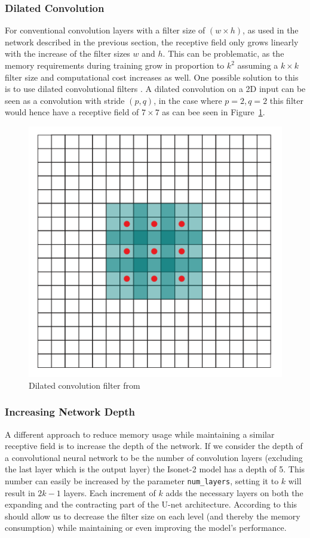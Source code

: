 \documentclass[a4paper, 12pt]{article} %
\begin{document}
\subsubsection{Dilated Convolution}
For conventional convolution layers with a filter size of $(w \times h)$, as used in the network described in the previous section, the receptive field only grows linearly with the increase of the filter sizes $w$ and $h$. This can be problematic, as the memory requirements during training grow in proportion to $k^2$ assuming a $k \times k$ filter size and computational cost increases as well. One possible solution to this is to use dilated convolutional filters \citep{ferenc-dilated}. A dilated convolution on a 2D input can be seen as a convolution with stride $(p, q)$, in the case where $p=2, q=2$ this filter would hence have a receptive field of $7 \times 7$ as can bee seen in Figure~\ref{fig:dilated}.
\begin{figure}[h]
    \center%
    \includegraphics[width=0.3\columnwidth]{figures/dilated.png}
    \caption{Dilated convolution filter from~\cite{ferenc-dilated}}\label{fig:dilated}
\end{figure}

\subsubsection{Increasing Network Depth}
A different approach to reduce memory usage while maintaining a similar receptive field is to increase the depth of the network. If we consider the depth of a convolutional neural network to be the number of convolution layers (excluding the last layer which is the output layer) the Isonet-2 model has a depth of 5. This number can easily be increased by the parameter \texttt{num\_layers}, setting it to $k$ will result in $2k-1$ layers. Each increment of $k$ adds the necessary layers on both the expanding and the contracting part of the U-net architecture. According to \citet{depth} this should allow us to decrease the filter size on each level (and thereby the memory consumption) while maintaining or even improving the model's performance.
\end{document}
